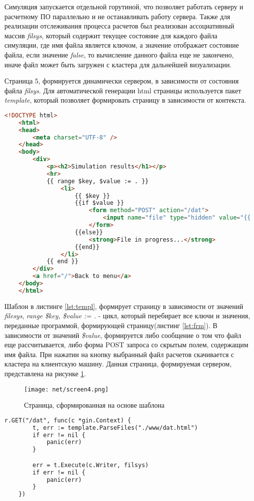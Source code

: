 Симуляция запускается отдельной горутиной, что позволяет работать серверу и расчетному ПО параллельно и не останавливать работу сервера. Также для реализации 
отслеживания процесса расчетов был реализован ассоциативный массив \textit{filsys}, который содержит текущее состояние для каждого файла симуляции, где имя файла является ключом, 
а значение отображает состояние файла, если значение \textit{false}, то вычисление данного файла еще не закончено, иначе файл может быть загружен с кластера для дальнейшей 
визуализации.

Страница 5, формируется динамически сервером, в зависимости от состояния файла \textit{filsys}. Для автоматической генерации html страницы используется 
пакет \textit{template}, который позволяет формировать страницу в зависимости от контекста.

\begin{lstlisting}[numbers=none, language=html,caption=Html шаблон, label=lst:templ]
    <!DOCTYPE html>
    <html>
    <head>
        <meta charset="UTF-8" />
    </head>
    <body>
        <div>
            <p><h2>Simulation results</h1></p>
            <hr>
            {{ range $key, $value := . }}
                <li>
                    {{ $key }}
                    {{if $value }}
                        <form method="POST" action="/dat">
                            <input name="file" type="hidden" value="{{ $key }}"><input type="submit"  value="Download">
                        </form>
                    {{else}}
                        <strong>File in progress...</strong>
                    {{end}}
                </li>
            {{ end }}
        </div>
        <a href="/">Back to menu</a>
    </body>
    </html>
\end{lstlisting}

Шаблон в листинге \ref{lst:templ}, формирует страницу в зависимости от значений \textit{filesys}, \textit{range  \$key, \$value := . } - цикл, 
который перебирает все ключи и значения, переданные программой, формирующей страницу(листинг \ref{lst:frm}). В зависимости от значений \textit{\$value}, формируется либо сообщение
о том что файл еще рассчитывается, либо форма POST запроса со скрытым полем, содержащим имя файла. При нажатии на кнопку выбранный файл расчетов скачивается
с кластера на клиентскую машину. Данная страница, формируемая сервером, представлена на рисунке \ref{fig:din}.


\begin{figure}
	\centering
	\texttt{[image: net/screen4.png]}
	\caption{Страница, сформированная на основе шаблона}
	\label{fig:din}
\end{figure}

\begin{lstlisting}[numbers=none, language=html,caption=Формирование html, label=lst:frm]
r.GET("/dat", func(c *gin.Context) {
		t, err := template.ParseFiles("./www/dat.html")
		if err != nil {
			panic(err)
		}

		err = t.Execute(c.Writer, filsys)
		if err != nil {
			panic(err)
		}
    })
\end{lstlisting}
